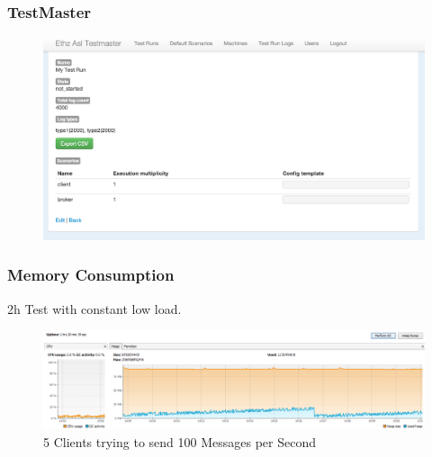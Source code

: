 \documentclass{beamer}
\begin{document}
\begin{frame}
\frametitle{TestMaster}
\begin{figure}
  \begin{center}
    \includegraphics[scale=0.3]{../../drawings/TestMaster05.png}
  \end{center}
  \label{fig:testsystem}
\end{figure}
\end{frame}



\begin{frame}
\frametitle{Memory Consumption}
2h Test with constant low load.
\begin{figure}
  \begin{center}
    \includegraphics[scale=0.3]{5clientsAt100msPerSecond.PNG}
  \end{center}
  \caption{5 Clients trying to send 100 Messages per Second}
  \label{fig:testsystem}
\end{figure}
\end{frame}
\end{document}

